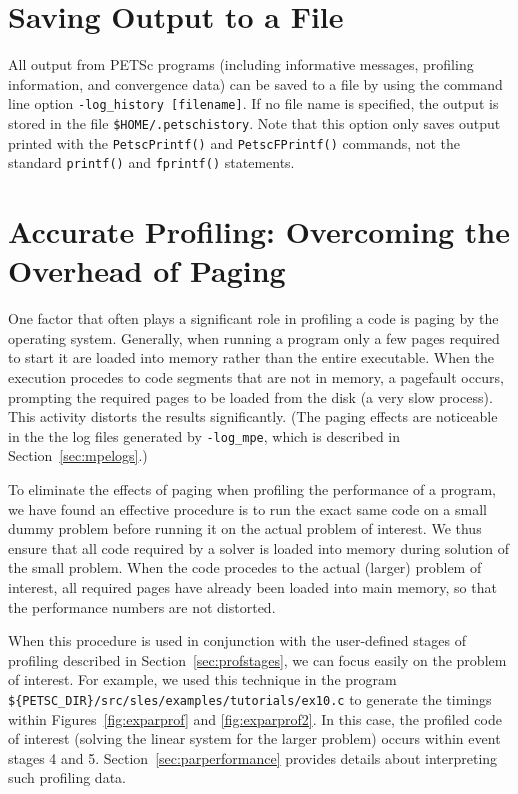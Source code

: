 {%
\section{Saving Output to a File}

All output from PETSc programs (including informative messages, profiling information,
and convergence data) can be saved to a file by using the command line
option {\tt -log\_history [filename]}. 
If no file name is specified, the output is stored in the file {\tt \$HOME/.petschistory}.
 Note that this option only saves output printed with 
the {\tt PetscPrintf()} and {\tt PetscFPrintf()} commands, not the
standard {\tt printf()} and {\tt fprintf()} statements. 
 

\section{Accurate Profiling: Overcoming the Overhead of Paging}
\label{sec:profaccuracy}

One factor that often plays a significant role in profiling a code is
paging by the operating system.  Generally, when running a program
only a few pages required to start it are loaded into memory rather
than the entire executable.  When the execution procedes to code
segments that are not in memory, a pagefault occurs, prompting the
required pages to be loaded from the disk (a very slow process).  This
activity distorts the results significantly. (The paging effects are
noticeable in the the log files generated by {\tt -log\_mpe}, which is
described in Section~\ref{sec:mpelogs}.)

To eliminate the effects of paging when profiling the performance of a
program, we have found an effective procedure is to run the exact same
code on a small dummy problem before running it on the actual problem
of interest. We thus ensure that all code required by a solver is
loaded into memory during solution of the small problem.  When the
code procedes to the actual (larger) problem of interest, all required
pages have already been loaded into main memory, so that the
performance numbers are not distorted.

When this procedure is used in conjunction with the user-defined stages of profiling
described in Section~\ref{sec:profstages}, we can focus easily on the
problem of interest.  For example, we used this technique in the program
{\tt \$\{PETSC\_DIR\}/src/sles/examples/tutorials/ex10.c} to
generate the timings within Figures~\ref{fig:exparprof} and \ref{fig:exparprof2}.
In this case,
the profiled code of interest (solving the linear system for the larger problem)
occurs within event stages 4 and 5.  Section~\ref{sec:parperformance} provides
details about interpreting such profiling data.

}
